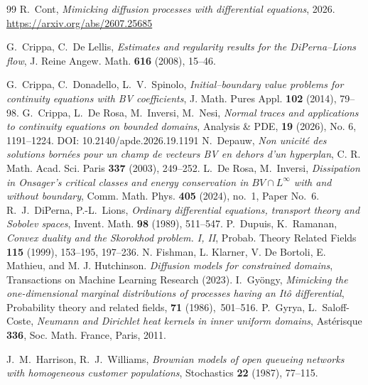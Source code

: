 \documentclass[11pt]{amsart}
\theoremstyle{definition}
\begin{document}
\begin{thebibliography}{99}
R.~Cont,
\emph{Mimicking diffusion processes with differential equations}, 2026.\\
 \url{https://arxiv.org/abs/2607.25685}

G.~Crippa, C.~De Lellis,
\emph{Estimates and regularity results for the DiPerna--Lions flow},
J. Reine Angew. Math. \textbf{616} (2008), 15--46.

G.~Crippa, C.~Donadello, L.~V.~Spinolo,
\emph{Initial--boundary value problems for continuity equations with
BV coefficients}, J. Math. Pures Appl. \textbf{102} (2014), 79--98.
G.~Crippa, L.~De Rosa, M.~Inversi, M.~Nesi,
\emph{Normal traces and applications to continuity equations on
bounded domains}, Analysis \& PDE, \textbf{19} (2026), No. 6, 1191–1224.
DOI: 10.2140/apde.2026.19.1191
N.~Depauw,
\emph{Non unicit\'e des solutions born\'ees pour un champ de
vecteurs BV en dehors d'un hyperplan}, C. R. Math. Acad. Sci. Paris
\textbf{337} (2003), 249--252.
L.~De Rosa, M.~Inversi,
\emph{Dissipation in Onsager's critical classes and energy
conservation in $BV\cap L^\infty$ with and without boundary},
Comm. Math. Phys. \textbf{405} (2024), no.~1, Paper No.~6.
R.~J.~DiPerna, P.-L.~Lions,
\emph{Ordinary differential equations, transport theory and Sobolev
spaces}, Invent. Math. \textbf{98} (1989), 511--547.
P.~Dupuis, K.~Ramanan,
\emph{Convex duality and the Skorokhod problem. I, II},
Probab. Theory Related Fields \textbf{115} (1999), 153--195,
197--236.
N. Fishman, L. Klarner, V. De Bortoli, E. Mathieu, and M. J. Hutchinson. \emph{Diffusion models for constrained domains}, Transactions on Machine Learning Research (2023).
{ I.~Gy{\"o}ngy}, {\em Mimicking the one-dimensional marginal distributions
  of processes having an {It{\^o}} differential}, Probability theory and
  related fields, \textbf{71} (1986),~501--516.
P.~Gyrya, L.~Saloff-Coste,
\emph{Neumann and Dirichlet heat kernels in inner uniform domains},
Ast\'erisque \textbf{336}, Soc. Math. France, Paris, 2011.


J.~M.~Harrison, R.~J.~Williams,
\emph{Brownian models of open queueing networks with homogeneous
customer populations}, Stochastics \textbf{22} (1987), 77--115.


\end{thebibliography}
\end{document}
